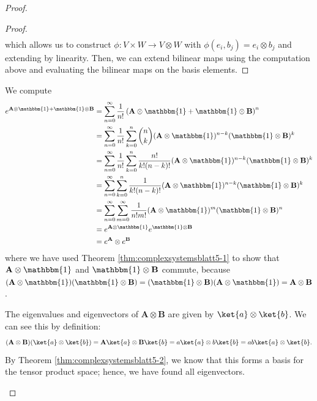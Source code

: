\begin{proof}
\begin{proof}
\begin{align*}
		\end{align*}
		which allows us to construct $\phi:V\times W \to V\otimes W$ with $\phi(e_i, b_j) = e_i\otimes b_j$ and extending by linearity. Then, we can extend bilinear maps using the computation above and evaluating the bilinear maps on the basis elements. 
	\end{proof}
	\begin{parts}
	\item We compute
		\begin{align*}
			e^{\mathbf{A}\otimes \mathbbm{1}+\mathbbm{1}\otimes \mathbf{B}}&= \sum_{n=0}^{\infty} \frac{1}{n!}\left( \mathbf{A}\otimes \mathbbm{1} + \mathbbm{1}\otimes \mathbf{B} \right)^n  \\
										       &= \sum_{n=0}^{\infty}\frac{1}{n!} \sum_{k=0}^{n} \binom{n}{k}(\mathbf{A}\otimes \mathbbm{1})^{n-k} (\mathbbm{1}\otimes \mathbf{B})^k\\
										       &= \sum_{n=0}^{\infty}\frac{1}{n!} \sum_{k=0}^{n} \frac{n!}{k!(n-k)!}(\mathbf{A}\otimes \mathbbm{1})^{n-k} (\mathbbm{1}\otimes \mathbf{B})^k\\
										       &= \sum_{n=0}^{\infty}\sum_{k=0}^{n} \frac{1}{k!(n-k)!}(\mathbf{A}\otimes \mathbbm{1})^{n-k} (\mathbbm{1}\otimes \mathbf{B})^k\\
										       &= \sum_{n=0}^{\infty}\sum_{m=0}^{\infty} \frac{1}{n!m!}(\mathbf{A}\otimes \mathbbm{1})^{m} (\mathbbm{1}\otimes \mathbf{B})^n\\
										       &= e^{\mathbf{A}\otimes \mathbbm{1}}e^{\mathbbm{1}\otimes\mathbf{B}} \\
										       &= e^{\mathbf{A}}\otimes e^\mathbf{B} 
		\end{align*}
		where we have used Theorem \ref{thm:complexsystemsblatt5-1} to show that $\mathbf{A}\otimes\mathbbm{1}$ and $\mathbbm{1}\otimes \mathbf{B}$ commute, because $(\mathbf{A}\otimes \mathbbm{1})(\mathbbm{1}\otimes\mathbf{B}) = (\mathbbm{1}\otimes \mathbf{B})(\mathbf{A}\otimes \mathbbm{1}) = \mathbf{A}\otimes \mathbf{B}$.
	\item The eigenvalues and eigenvectors of $\mathbf{A}\otimes \mathbf{B}$ are given by $\ket{a}\otimes \ket{b}$. We can see this by definition:
		\[
			(\mathbf{A}\otimes \mathbf{B})(\ket{a}\otimes\ket{b})=\mathbf{A}\ket{a}\otimes \mathbf{B}\ket{b}=a\ket{a}\otimes b\ket{b} = ab\ket{a}\otimes\ket{b}
		.\] 
		By Theorem \ref{thm:complexsystemsblatt5-2}, we know that this forms a basis for the tensor product space; hence, we have found all eigenvectors.


\end{parts}
\end{proof}
